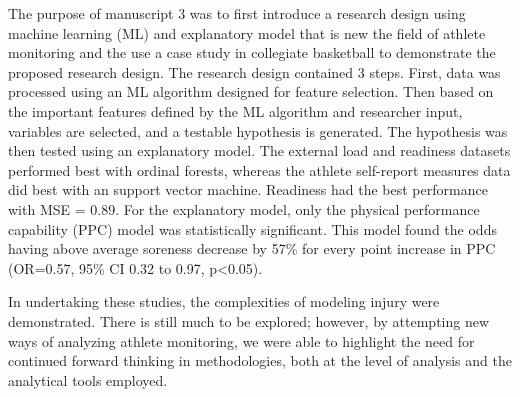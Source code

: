 The purpose of manuscript 3 was to first introduce a research design using machine learning (ML) and explanatory model that is new the field of athlete monitoring and the use a case study in collegiate basketball to demonstrate the proposed research design. The research design contained 3 steps. First, data was processed using an ML algorithm designed for feature selection. Then based on the important features defined by the ML algorithm and researcher input, variables are selected, and a testable hypothesis is generated. The hypothesis was then tested using an explanatory model. The external load and readiness datasets performed best with ordinal forests, whereas the athlete self-report measures data did best with an support vector machine. Readiness had the best performance with MSE = 0.89. For the explanatory model, only the physical performance capability (PPC) model was statistically significant. This model found the odds having above average soreness decrease by 57\% for every point increase in PPC (OR=0.57, 95\% CI 0.32 to 0.97, p<0.05).

In undertaking these studies, the complexities of modeling injury were demonstrated. There is still much to be explored; however, by attempting new ways of analyzing athlete monitoring, we were able to highlight the need for continued forward thinking in methodologies, both at the level of analysis and the analytical tools employed. 